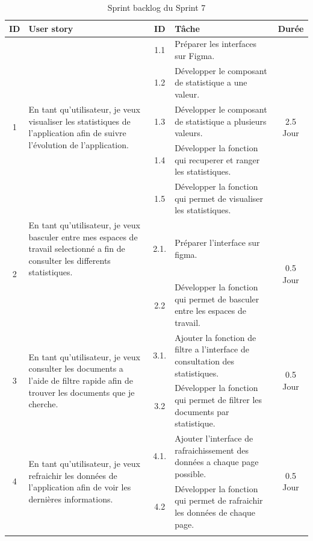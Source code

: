 \begin{adjustwidth}{-1cm}{}
    
    \begin{longtable}{|c|p{6cm}|c|p{6cm}|c|}
      \hline
      \textbf{ID} & \textbf{User story} & \textbf{ID}  & \textbf{Tâche} & \textbf{Durée} \\
      \hline
      \multirow{5}{*}{1} & \multirow{5}{6cm}{En tant qu'utilisateur, je veux visualiser les statistiques de l'application afin de suivre l'évolution de l'application.}
      & 1.1 & Préparer les interfaces sur Figma. & \multirow{5}{*}{2.5 Jour} \\
      \cline{3-4}
      & & 1.2 & Développer le composant de statistique a une valeur. & \\
      \cline{3-4}
      & & 1.3 & Développer le composant de statistique a plusieurs valeurs. & \\
      \cline{3-4}
      & & 1.4 & Développer la fonction qui recuperer et ranger les statistiques. & \\
      \cline{3-4}
      & & 1.5 & Développer la fonction qui permet de visualiser les statistiques. & \\
      \cline{1-5}

      \multirow{2}{*}{2} & En tant qu'utilisateur, je veux basculer entre mes espaces de travail selectionné a fin de consulter les differents statistiques. & 2.1.& Préparer l'interface sur figma. & \multirow{2}{*}{0.5 Jour} \\
      \cline{3-4}
      & &  2.2 & Développer la fonction qui permet de basculer entre les espaces de travail. & \\
      \cline{1-5}
      \multirow{2}{*}{3} & \multirow{2}{6cm}{En tant qu'utilisateur, je veux consulter les documents a l'aide de filtre rapide afin de trouver les documents que je cherche.} & 3.1.& Ajouter la fonction de filtre a l'interface de consultation des statistiques. & \multirow{2}{*}{0.5 Jour} \\
      \cline{3-4}
      & & 3.2 & Développer la fonction qui permet de filtrer les documents par statistique. & \\
      \cline{1-5}
      \multirow{2}{*}{4} & \multirow{2}{6cm}{En tant qu'utilisateur, je veux refraichir les données de l'application afin de voir les dernières informations.} & 4.1.& Ajouter l'interface de rafraichissement des données a chaque page possible. & \multirow{2}{*}{0.5 Jour} \\
      \cline{3-4}
      & & 4.2 & Développer la fonction qui permet de rafraichir les données de chaque page. & \\
  \hline
  \caption{Sprint backlog du Sprint 7}
  \label{tab:sprint-backlog-7}
\end{longtable}
\end{adjustwidth}


